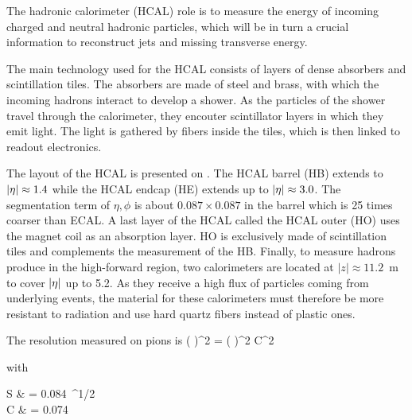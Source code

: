         The hadronic calorimeter (HCAL) role is to measure the energy of incoming charged
        and neutral hadronic particles, which will be in turn a crucial information to
        reconstruct jets and missing transverse energy.

        The main technology used for the HCAL consists of layers of dense absorbers and
        scintillation tiles. The absorbers are made of steel and brass, with which
        the incoming hadrons interact to develop a shower. As the particles of the shower
        travel through the calorimeter, they encouter scintillator layers in which they
        emit light. The light is gathered by fibers inside the tiles, which is then
        linked to readout electronics.


        The layout of the HCAL is presented on . The HCAL barrel
        (HB) extends to $\left| \eta \right| \approx 1.4$ while the HCAL endcap (HE) extends up to
        $\left| \eta \right| \approx 3.0$. The segmentation term of $\eta,\phi$ is about $0.087 \times 0.087$
        in the barrel which is 25 times coarser than ECAL. A last layer of the HCAL called
        the HCAL outer (HO) uses the magnet coil as an absorption layer. HO is exclusively
        made of scintillation tiles and complements the measurement of the HB. Finally, to
        measure hadrons produce in the high-forward region, two calorimeters are located at
        $\left|z\right| \approx 11.2$~m to cover $\left| \eta \right|$ up to 5.2. As they receive a high flux of
        particles coming from underlying events, the material for these calorimeters must
        therefore be more resistant to radiation and use hard quartz fibers instead of
        plastic ones.

        The resolution measured on pions is
        {
            \left(  \right)^2
            =
            \left(  \right)^2
            \oplus
            C^2
        }

        with

        {
            S & = 0.084~^{1/2} \\
            C & = 0.074\nonumber
        }


